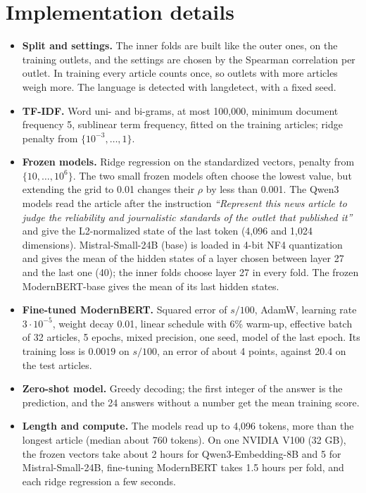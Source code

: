 \documentclass[11pt,a4paper]{article}
\begin{document}
\section{Implementation details}\label{app:impl}
\begin{itemize}
  \item \textbf{Split and settings.} The inner folds are built like the outer ones, on the training outlets, and the
        settings are chosen by the Spearman correlation per outlet. In training every article counts once, so outlets
        with more articles weigh more. The language is detected with langdetect, with a fixed seed.
  \item \textbf{TF-IDF.} Word uni- and bi-grams, at most 100,000, minimum document frequency 5, sublinear term frequency,
        fitted on the training articles; ridge penalty from $\{10^{-3}, \ldots, 1\}$.
  \item \textbf{Frozen models.} Ridge regression on the standardized vectors, penalty from $\{10, \ldots, 10^6\}$. The
        two small frozen models often choose the lowest value, but extending the grid to 0.01 changes their $\rho$ by
        less than 0.001. The Qwen3 models read the article after the instruction \emph{``Represent this news article to
        judge the reliability and journalistic standards of the outlet that published it''} and give the L2-normalized
        state of the last token (4,096 and 1,024 dimensions). Mistral-Small-24B (base) is loaded in 4-bit NF4
        quantization and gives the mean of the hidden states of a layer chosen between layer 27 and the last one (40);
        the inner folds choose layer 27 in every fold. The frozen ModernBERT-base gives the mean of its last hidden
        states.
  \item \textbf{Fine-tuned ModernBERT.} Squared error of $s/100$, AdamW, learning rate $3 \cdot 10^{-5}$, weight decay
        0.01, linear schedule with 6\% warm-up, effective batch of 32 articles, 5 epochs, mixed precision, one seed, model
        of the last epoch. Its training loss is $0.0019$ on $s/100$, an error of about 4 points, against 20.4 on the
        test articles.
  \item \textbf{Zero-shot model.} Greedy decoding; the first integer of the answer is the prediction, and the 24 answers
        without a number get the mean training score.
  \item \textbf{Length and compute.} The models read up to 4,096 tokens, more than the longest article (median about 760
        tokens). On one NVIDIA V100 (32 GB), the frozen vectors take about 2 hours for Qwen3-Embedding-8B and 5 for
        Mistral-Small-24B, fine-tuning ModernBERT takes 1.5 hours per fold, and each ridge regression a few seconds.
\end{itemize}
\end{document}
